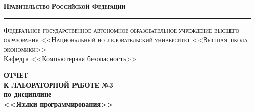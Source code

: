 \documentclass[a4paper,12pt]{article}
\begin{document}
\begin{titlepage}		

\begin{center}
	\textsc{\textbf{Правительство Российской Федерации}}\\
	\vspace{0.5cm}
	\hrule
	\vspace{0.5cm}
	\textsc{Федеральное государственное автономное образовательное учреждение высшего образования <<Национальный исследовательский университет <<Высшая школа экономики>>}\\
	\vspace{1cm}
	Кафедра <<Компьютерная безопасность>>
\end{center}	

\vspace{\fill}

\begin{center}
	\Large{\textbf{ОТЧЕТ \\ К ЛАБОРАТОРНОЙ РАБОТЕ №3}} \\
	\vspace{1em}
	\textbf{по дисциплине} \\
	\vspace{1em}
	\large{\textbf{<<Языки программирования>>}}
\end{center}

\vspace{\fill}


\end{titlepage}
\end{document}
